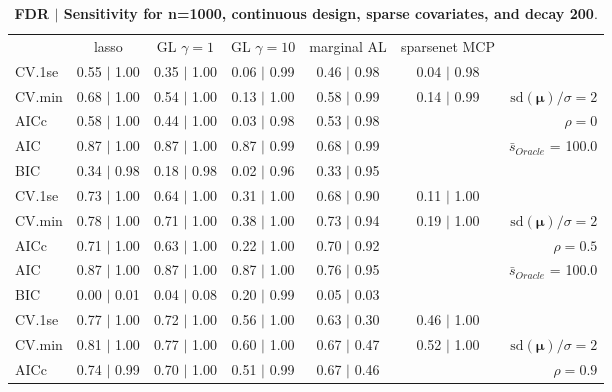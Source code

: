 \begin{table}\vspace{-.5cm}
\caption[l]{ {\it }
{ \bf FDR $\boldsymbol{\mid}$ Sensitivity for n=1000, continuous design, sparse covariates, and  decay  200}.}
\vspace{-.5cm}
\footnotesize{}
\begin{center}
\begin{tabular}{l*{5}{c}|r}
 & lasso & GL $\gamma=1$ & GL $\gamma=10$ & marginal AL & sparsenet MCP  & \\
 \cline{1-7}
CV.1se & 0.55 $\mid$ 1.00 & 0.35 $\mid$ 1.00 & 0.06 $\mid$ 0.99 & 0.46 $\mid$ 0.98 & 0.04 $\mid$ 0.98 & \\
CV.min & 0.68 $\mid$ 1.00 & 0.54 $\mid$ 1.00 & 0.13 $\mid$ 1.00 & 0.58 $\mid$ 0.99 & 0.14 $\mid$ 0.99 &  $\mathrm{sd}(\mathbf{\mu})/\sigma=2$ \\
AICc & 0.58 $\mid$ 1.00 & 0.44 $\mid$ 1.00 & 0.03 $\mid$ 0.98 & 0.53 $\mid$ 0.98 & & $\rho=0$ \\
AIC & 0.87 $\mid$ 1.00 & 0.87 $\mid$ 1.00 & 0.87 $\mid$ 0.99 & 0.68 $\mid$ 0.99 & &  \multirow{2}{*}{$\bar{s}_{Oracle}$ = 100.0} \\
BIC & 0.34 $\mid$ 0.98 & 0.18 $\mid$ 0.98 & 0.02 $\mid$ 0.96 & 0.33 $\mid$ 0.95 & &  \\
 \hline 
CV.1se & 0.73 $\mid$ 1.00 & 0.64 $\mid$ 1.00 & 0.31 $\mid$ 1.00 & 0.68 $\mid$ 0.90 & 0.11 $\mid$ 1.00 & \\
CV.min & 0.78 $\mid$ 1.00 & 0.71 $\mid$ 1.00 & 0.38 $\mid$ 1.00 & 0.73 $\mid$ 0.94 & 0.19 $\mid$ 1.00 &  $\mathrm{sd}(\mathbf{\mu})/\sigma=2$ \\
AICc & 0.71 $\mid$ 1.00 & 0.63 $\mid$ 1.00 & 0.22 $\mid$ 1.00 & 0.70 $\mid$ 0.92 & & $\rho=0.5$ \\
AIC & 0.87 $\mid$ 1.00 & 0.87 $\mid$ 1.00 & 0.87 $\mid$ 1.00 & 0.76 $\mid$ 0.95 & &  \multirow{2}{*}{$\bar{s}_{Oracle}$ = 100.0} \\
BIC & 0.00 $\mid$ 0.01 & 0.04 $\mid$ 0.08 & 0.20 $\mid$ 0.99 & 0.05 $\mid$ 0.03 & &  \\
 \hline 
CV.1se & 0.77 $\mid$ 1.00 & 0.72 $\mid$ 1.00 & 0.56 $\mid$ 1.00 & 0.63 $\mid$ 0.30 & 0.46 $\mid$ 1.00 & \\
CV.min & 0.81 $\mid$ 1.00 & 0.77 $\mid$ 1.00 & 0.60 $\mid$ 1.00 & 0.67 $\mid$ 0.47 & 0.52 $\mid$ 1.00 &  $\mathrm{sd}(\mathbf{\mu})/\sigma=2$ \\
AICc & 0.74 $\mid$ 0.99 & 0.70 $\mid$ 1.00 & 0.51 $\mid$ 0.99 & 0.67 $\mid$ 0.46 & & $\rho=0.9$ \\

\end{tabular}
\end{center}
\end{table}
